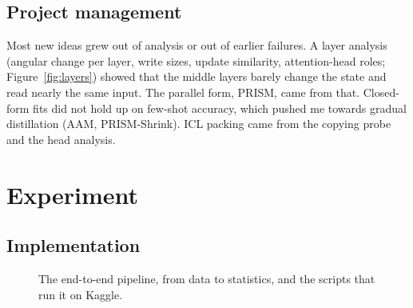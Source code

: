 \documentclass[11pt]{article}
\begin{document}
\subsection{Project management}

Most new ideas grew out of analysis or out of earlier failures. A layer analysis (angular change per layer, write
sizes, update similarity, attention-head roles; Figure~\ref{fig:layers}) showed that the middle layers barely change
the state and read nearly the same input. The parallel form, PRISM, came from that. Closed-form fits did not hold up
on few-shot accuracy, which pushed me towards gradual distillation (AAM, PRISM-Shrink). ICL packing came from the
copying probe and the head analysis.

\begin{table}[t]
\centering\small
{}
\caption{Computational resources.}
\label{tab:compute}
\end{table}


\section{Experiment}

\subsection{Implementation}
\label{sec:impl}

\begin{figure}[t]
\centering

\caption{The end-to-end pipeline, from data to statistics, and the scripts that run it on Kaggle.}
\label{fig:pipeline}
\end{figure}
\end{document}
